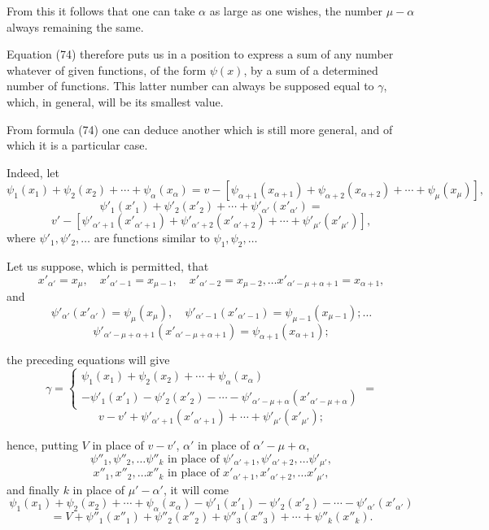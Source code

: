 \documentclass{article}
\begin{document}
From this it follows that one can take $\alpha$ as large as one wishes, the number $\mu-\alpha$ always remaining the same.

Equation (74) therefore puts us in a position to express a sum of any number whatever of given functions, of the form $\psi(x)$, by a sum of a determined number of functions. This latter number can always be supposed equal to $\gamma$, which, in general, will be its smallest value.

From formula (74) one can deduce another which is still more general, and of which it is a particular case.

Indeed, let
\[ \psi_1(x_1)+\psi_2(x_2)+\cdots+\psi_\alpha(x_\alpha) = v - \left[\psi_{\alpha+1}(x_{\alpha+1})+\psi_{\alpha+2}(x_{\alpha+2})+\cdots+\psi_\mu(x_\mu)\right], \tag{111} \]
\[ \psi'_1(x'_1) + \psi'_2(x'_2) + \cdots + \psi'_{\alpha'}(x'_{\alpha'}) = \]
\[ v' - \left[\psi'_{\alpha'+1}(x'_{\alpha'+1})+\psi'_{\alpha'+2}(x'_{\alpha'+2})+\cdots+\psi'_{\mu'}(x'_{\mu'})\right], \]
where $\psi'_1, \psi'_2, \ldots$ are functions similar to $\psi_1, \psi_2, \ldots$

Let us suppose, which is permitted, that
\[ x'_{\alpha'} = x_\mu, \quad x'_{\alpha'-1} = x_{\mu-1}, \quad x'_{\alpha'-2} = x_{\mu-2}, \ldots x'_{\alpha'-\mu+\alpha+1} = x_{\alpha+1}, \]
and
\[ \psi'_{\alpha'}(x'_{\alpha'}) = \psi_\mu(x_\mu), \quad \psi'_{\alpha'-1}(x'_{\alpha'-1}) = \psi_{\mu-1}(x_{\mu-1}); \ldots \]
\[ \psi'_{\alpha'-\mu+\alpha+1}(x'_{\alpha'-\mu+\alpha+1}) = \psi_{\alpha+1}(x_{\alpha+1}); \]

the preceding equations will give
\[ \gamma = \begin{cases}
\psi_1(x_1)+\psi_2(x_2)+\cdots+\psi_\alpha(x_\alpha) \\
-\psi'_1(x'_1)-\psi'_2(x'_2)-\cdots-\psi'_{\alpha'-\mu+\alpha}(x'_{\alpha'-\mu+\alpha})
\end{cases} = \]
\[ v-v'+\psi'_{\alpha'+1}(x'_{\alpha'+1})+\cdots+\psi'_{\mu'}(x'_{\mu'}); \]

hence, putting $V$ in place of $v-v'$, $\alpha'$ in place of $\alpha'-\mu+\alpha$,
\[ \psi''_1, \psi''_2, \ldots \psi''_k \text{ in place of } \psi'_{\alpha'+1}, \psi'_{\alpha'+2}, \ldots \psi'_{\mu'}, \]
\[ x''_1, x''_2, \ldots x''_k \text{ in place of } x'_{\alpha'+1}, x'_{\alpha'+2}, \ldots x'_{\mu'}, \]
and finally $k$ in place of $\mu'-\alpha'$, it will come
\[ \psi_1(x_1)+\psi_2(x_2)+\cdots+\psi_\alpha(x_\alpha)-\psi'_1(x'_1)-\psi'_2(x'_2)-\cdots-\psi'_{\alpha'}(x'_{\alpha'}) \]
\[ = V + \psi''_1(x''_1) + \psi''_2(x''_2) + \psi''_3(x''_3) + \cdots + \psi''_k(x''_k). \tag{112} \]
\end{document}
